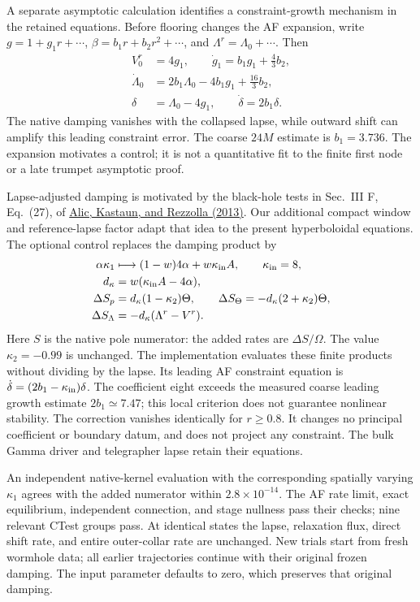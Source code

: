 \documentclass[11pt]{article}
\begin{document}
A separate asymptotic calculation identifies a constraint-growth mechanism in the retained equations. Before flooring changes the AF expansion, write $g=1+g_1r+\cdots$, $\beta=b_1r+b_2r^2+\cdots$, and $\Lambda^r=\Lambda_0+\cdots$. Then
\begin{align}
 V^r_0&=4g_1,\qquad \dot g_1=b_1g_1+\frac43b_2,\\
 \dot\Lambda_0&=2b_1\Lambda_0-4b_1g_1+\frac{16}3b_2,\\
 \delta&=\Lambda_0-4g_1,\qquad \dot\delta=2b_1\delta.
\end{align}
The native damping vanishes with the collapsed lapse, while outward shift can amplify this leading constraint error. The coarse $24M$ estimate is $b_1=3.736$. The expansion motivates a control; it is not a quantitative fit to the finite first node or a late trumpet asymptotic proof.

Lapse-adjusted damping is motivated by the black-hole tests in Sec.~III F, Eq.~(27), of \href{https://arxiv.org/html/1307.7391}{Alic, Kastaun, and Rezzolla (2013)}. Our additional compact window and reference-lapse factor adapt that idea to the present hyperboloidal equations. The optional control replaces the damping product by
\begin{align}
 \alpha\kappa_1&\longmapsto(1-w)4\alpha+w\kappa_{\rm in}A,
       \qquad\kappa_{\rm in}=8,\\
 d_\kappa&=w(\kappa_{\rm in}A-4\alpha),\\
 \Delta S_p&=d_\kappa(1-\kappa_2)\Theta,\qquad
 \Delta S_\Theta=-d_\kappa(2+\kappa_2)\Theta,\\
 \Delta S_\Lambda&=-d_\kappa(\Lambda^r-V^r).
\end{align}
Here $S$ is the native pole numerator: the added rates are $\Delta S/\Omega$. The value $\kappa_2=-0.99$ is unchanged. The implementation evaluates these finite products without dividing by the lapse. Its leading AF constraint equation is $\dot\delta=(2b_1-\kappa_{\rm in})\delta$. The coefficient eight exceeds the measured coarse leading growth estimate $2b_1\simeq7.47$; this local criterion does not guarantee nonlinear stability. The correction vanishes identically for $r\geq0.8$. It changes no principal coefficient or boundary datum, and does not project any constraint. The bulk Gamma driver and telegrapher lapse retain their equations.

An independent native-kernel evaluation with the corresponding spatially varying $\kappa_1$ agrees with the added numerator within $2.8\times10^{-14}$. The AF rate limit, exact equilibrium, independent connection, and stage nullness pass their checks; nine relevant CTest groups pass. At identical states the lapse, relaxation flux, direct shift rate, and entire outer-collar rate are unchanged. New trials start from fresh wormhole data; all earlier trajectories continue with their original frozen damping. The input parameter defaults to zero, which preserves that original damping.
\end{document}
